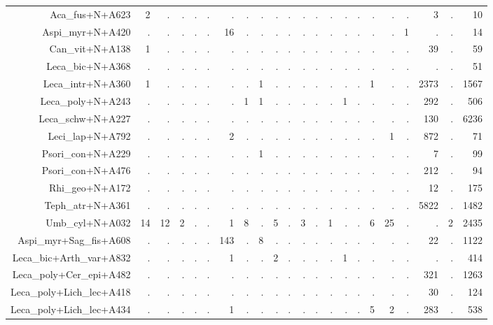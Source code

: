 \documentclass[a4paper, 11]{article}\usepackage[]{graphicx}\usepackage[]{color}
\begin{document}
\begin{table}
\begin{tabular}{rrrrrrrrrrrrrrrrrrrrrr}
  \hline
Aca\_fus+N+A623 & 2 & . & . & . & . & . & . & . & . & . & . & . & . & . & . & . & . & . & 3 & . & 10 \\ 
  Aspi\_myr+N+A420 & . & . & . & . & . & 16 & . & . & . & . & . & . & . & . & . & . & . & 1 & . & . & 14 \\ 
  Can\_vit+N+A138 & 1 & . & . & . & . & . & . & . & . & . & . & . & . & . & . & . & . & . & 39 & . & 59 \\ 
  Leca\_bic+N+A368 & . & . & . & . & . & . & . & . & . & . & . & . & . & . & . & . & . & . & . & . & 51 \\ 
  Leca\_intr+N+A360 & 1 & . & . & . & . & . & . & 1 & . & . & . & . & . & . & . & 1 & . & . & 2373 & . & 1567 \\ 
  Leca\_poly+N+A243 & . & . & . & . & . & . & 1 & 1 & . & . & . & . & . & 1 & . & . & . & . & 292 & . & 506 \\ 
  Leca\_schw+N+A227 & . & . & . & . & . & . & . & . & . & . & . & . & . & . & . & . & . & . & 130 & . & 6236 \\ 
  Leci\_lap+N+A792 & . & . & . & . & . & 2 & . & . & . & . & . & . & . & . & . & . & 1 & . & 872 & . & 71 \\ 
  Psori\_con+N+A229 & . & . & . & . & . & . & . & 1 & . & . & . & . & . & . & . & . & . & . & 7 & . & 99 \\ 
  Psori\_con+N+A476 & . & . & . & . & . & . & . & . & . & . & . & . & . & . & . & . & . & . & 212 & . & 94 \\ 
  Rhi\_geo+N+A172 & . & . & . & . & . & . & . & . & . & . & . & . & . & . & . & . & . & . & 12 & . & 175 \\ 
  Teph\_atr+N+A361 & . & . & . & . & . & . & . & . & . & . & . & . & . & . & . & . & . & . & 5822 & . & 1482 \\ 
  Umb\_cyl+N+A032 & 14 & 12 & 2 & . & . & 1 & 8 & . & 5 & . & 3 & . & 1 & . & . & 6 & 25 & . & . & 2 & 2435 \\ 
  Aspi\_myr+Sag\_fis+A608 & . & . & . & . & . & 143 & . & 8 & . & . & . & . & . & . & . & . & . & . & 22 & . & 1122 \\ 
  Leca\_bic+Arth\_var+A832 & . & . & . & . & . & 1 & . & . & 2 & . & . & . & . & 1 & . & . & . & . & . & . & 414 \\ 
  Leca\_poly+Cer\_epi+A482 & . & . & . & . & . & . & . & . & . & . & . & . & . & . & . & . & . & . & 321 & . & 1263 \\ 
  Leca\_poly+Lich\_lec+A418 & . & . & . & . & . & . & . & . & . & . & . & . & . & . & . & . & . & . & 30 & . & 124 \\ 
  Leca\_poly+Lich\_lec+A434 & . & . & . & . & . & 1 & . & . & . & . & . & . & . & . & . & 5 & 2 & . & 283 & . & 538 \\ 

\end{tabular}
\end{table}
\end{document}
